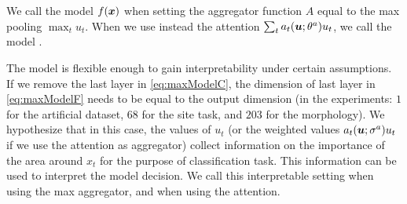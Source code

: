 We call \maxp{} the model $f(\bm{x})$ when setting the aggregator
function $A$ equal to the max pooling $\max_t u_t$. When we use
instead the attention $\sum_t a_t(\bm{u};\theta^a) u_t$, we call the
model \softmax{}.

The model is flexible enough to gain interpretability under certain
assumptions. If we remove the last layer in \eqref{eq:maxModelC},
the dimension of last layer in \eqref{eq:maxModelF}
needs to be equal to the
output dimension (in the experiments: $1$ for the artificial dataset,
$68$ for the site task, and $203$ for the 
morphology).
We hypothesize that in this case, the values of
$u_t$ (or the weighted values $a_t(\bm{u};\sigma^a)u_t$ if we use the
attention as aggregator) collect information on the importance of the
area 
around $x_t$ for the purpose of classification task. This
information can be
used to interpret the model decision. We call \maxi{} this
interpretable setting when using the max aggregator, and \softmaxi{}
when using the attention.
